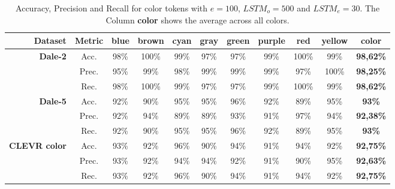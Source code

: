 \begin{table}[ht]
    \centering
    \begin{tabular}{r|c|cccccccc|c}
        \toprule
        \textbf{Dataset}                      & {Metric} & {blue} & {brown} & {cyan} & {gray} & {green} & {purple} & {red}   & {yellow} & \textbf{color}   \\\midrule
        \multirow{3}{*}{\textbf{Dale-2}}      & {Acc.}   & {98\%} & {100\%} & {99\%} & {97\%} & {97\%}  & {99\%}   & {100\%} & {99\%}   & \textbf{98,62\%} \\
                                              & {Prec.}  & {95\%} & {99\%}  & {98\%} & {99\%} & {99\%}  & {99\%}   & {97\%}  & {100\%}  & \textbf{98,25\%} \\
                                              & {Rec.}   & {98\%} & {100\%} & {99\%} & {97\%} & {97\%}  & {99\%}   & {100\%} & {99\%}   & \textbf{98,62\%} \\\midrule
        \multirow{3}{*}{\textbf{Dale-5}}      & {Acc.}   & {92\%} & {90\%}  & {95\%} & {95\%} & {96\%}  & {92\%}   & {89\%}  & {95\%}   & \textbf{93\%}    \\
                                              & {Prec.}  & {92\%} & {94\%}  & {89\%} & {89\%} & {93\%}  & {91\%}   & {97\%}  & {94\%}   & \textbf{92,38\%} \\
                                              & {Rec.}   & {92\%} & {90\%}  & {95\%} & {95\%} & {96\%}  & {92\%}   & {89\%}  & {95\%}   & \textbf{93\%}    \\\midrule
        \multirow{3}{*}{\textbf{CLEVR color}} & {Acc.}   & {93\%} & {92\%}  & {96\%} & {90\%} & {94\%}  & {91\%}   & {94\%}  & {92\%}   & \textbf{92,75\%} \\
                                              & {Prec.}  & {93\%} & {92\%}  & {94\%} & {94\%} & {92\%}  & {91\%}   & {90\%}  & {95\%}   & \textbf{92,63\%} \\
                                              & {Rec.}   & {93\%} & {92\%}  & {96\%} & {90\%} & {94\%}  & {91\%}   & {94\%}  & {92\%}   & \textbf{92,75\%} \\




        \bottomrule
    \end{tabular}
    \caption{Accuracy, Precision and Recall for color tokens with $e=100$, $LSTM_o=500$ and $LSTM_e=30$. The Column \textbf{color} shows the average across all colors.}
    \label{tab:results:bb-re-generator_color}
\end{table}

